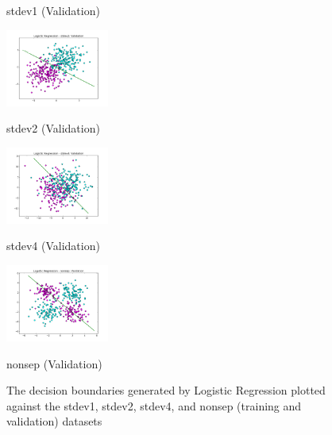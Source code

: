 \documentclass[10pt]{article}
\begin{document}
\begin{figure}[ht]
\begin{minipage}[b]{.24\linewidth}
		\caption*{stdev1 (Validation)}
	\end{minipage}
	\begin{minipage}[b]{.24\linewidth}
		\includegraphics[width=1\linewidth, height=1in]{LR_stdev2_validation.png}
		\caption*{stdev2 (Validation)}
	\end{minipage}
	\begin{minipage}[b]{.24\linewidth}
		\includegraphics[width=1\linewidth, height=1in]{LR_stdev4_validation.png}
		\caption*{stdev4 (Validation)}
	\end{minipage}
	\begin{minipage}[b]{.24\linewidth}
		\includegraphics[width=1\linewidth, height=1in]{LR_nonsep_validation.png}
		\caption*{nonsep (Validation)}
	\end{minipage}
	\caption{The decision boundaries generated by Logistic Regression plotted against the stdev1, stdev2, stdev4, and nonsep (training and validation) datasets}
\end{figure}
\end{document}
